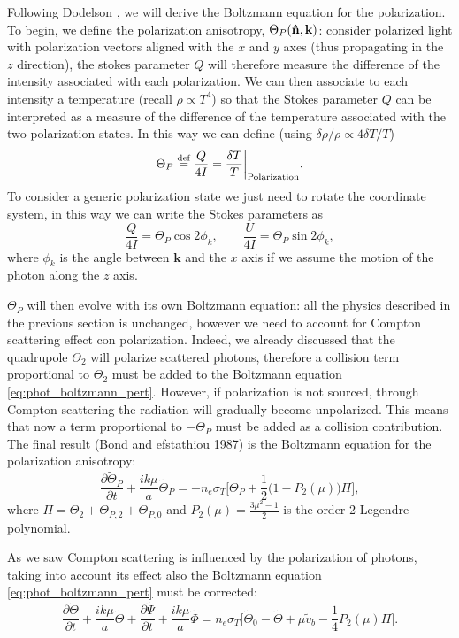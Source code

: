 Following Dodelson \cite{dodelson}, we will derive the Boltzmann equation for the polarization. To begin, we define the polarization anisotropy, $\Theta_P(\mathbf{\hat{n}}, \mathbf{k})$: consider polarized light  with polarization vectors aligned with the $x$ and $y$ axes (thus propagating in the $z$ direction), the stokes parameter $Q$ will therefore measure the difference of the intensity associated with each polarization. We can then associate to each intensity a temperature (recall $\rho\propto T^4$) so that the Stokes parameter $Q$ can be interpreted as a measure of the difference of the temperature associated with the two polarization states. In this way we can define (using $\delta\rho/\rho\propto4\delta T/T $) 
\begin{equation}\label{eq:ThetaP}
    \Theta_P\stackrel{\text{def}}{=}\frac{Q}{4I}=\frac{\delta T}{T}\bigg|_{\text{Polarization}}.
\end{equation}
To consider a generic polarization state we just need to rotate the coordinate system, in this way we can write the Stokes parameters as
$$\frac{Q}{4I}=\Theta_P\cos2\phi_k,\qquad \frac{U}{4I}=\Theta_P\sin2\phi_k,$$where $\phi_k$ is the angle between $\mathbf{k}$ and the $x$ axis if we assume the motion of the photon along the $z$ axis.

$\Theta_P$ will then evolve with its own Boltzmann equation:
all the physics described in the previous section is unchanged, however we need to account for Compton scattering effect con polarization. Indeed, we already discussed that the quadrupole $\Theta_2$ will polarize scattered photons, therefore a collision term proportional to $\Theta_2$ must be added to the Boltzmann equation \eqref{eq:phot_boltzmann_pert}. However, if polarization is not sourced, through Compton scattering the radiation will gradually become unpolarized. This means that now a term proportional to $-\Theta_P$ must be added as a collision contribution. The final result (Bond and efstathiou 1987) is the Boltzmann equation for the polarization anisotropy:
\begin{equation}\label{eq:ThetaP_Boltzmann}
    \frac{\partial \tilde\Theta_P}{\partial t}+\frac{ik\mu}{a}\tilde\Theta_P=-n_e\sigma_T\bigg[\Theta_{P}+\frac{1}{2}\bigg(1-P_2(\mu)\bigg)\Pi\bigg],
\end{equation}
where $\Pi=\Theta_2+\Theta_{P,2}+\Theta_{P,0}$ and $P_2(\mu)=\frac{3\mu^2-1}{2}$ is the order 2 Legendre polynomial.

As we saw Compton scattering is influenced by the polarization of photons, taking into account its effect also the Boltzmann equation \eqref{eq:phot_boltzmann_pert} must be corrected:
\begin{equation}\label{eq:phot_boltzmann_pert_pol}
    \frac{\partial \tilde\Theta}{\partial t} +\frac{ik\mu}{a}\tilde\Theta+\frac{\partial \tilde\Psi}{\partial t}+\frac{ik\mu}{a}\tilde\Phi=n_e \sigma_T\Bigg[\tilde\Theta_0-\tilde\Theta+\mu\tilde v_b-\frac{1}{4}P_2(\mu)\Pi\Bigg].
\end{equation}
